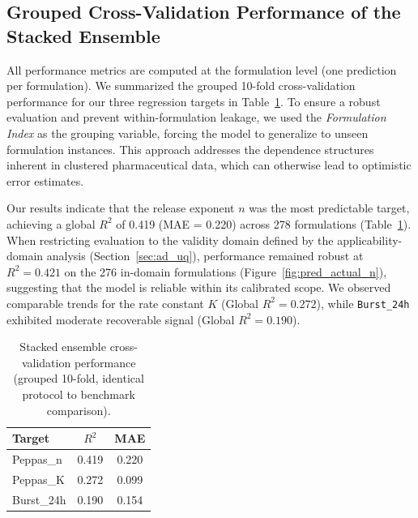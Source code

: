 \documentclass[preprint,12pt,authoryear]{elsarticle}
\begin{document}
\subsection{Grouped Cross-Validation Performance of the Stacked Ensemble}

All performance metrics are computed at the formulation level (one prediction per formulation). We summarized the grouped 10-fold cross-validation performance for our three regression targets in Table~\ref{tab:cv_performance}. To ensure a robust evaluation and prevent within-formulation leakage, we used the \textit{Formulation Index} as the grouping variable, forcing the model to generalize to unseen formulation instances. This approach addresses the dependence structures inherent in clustered pharmaceutical data, which can otherwise lead to optimistic error estimates.

Our results indicate that the release exponent $n$ was the most predictable target, achieving a global $R^2$ of 0.419 (MAE = 0.220) across 278 formulations (Table~\ref{tab:cv_performance}). When restricting evaluation to the validity domain defined by the applicability-domain analysis (Section~\ref{sec:ad_uq}), performance remained robust at $R^2 = 0.421$ on the 276 in-domain formulations (Figure~\ref{fig:pred_actual_n}), suggesting that the model is reliable within its calibrated scope. We observed comparable trends for the rate constant $K$ (Global $R^2 = 0.272$), while \texttt{Burst\_24h} exhibited moderate recoverable signal (Global $R^2 = 0.190$).


\begin{table}[H]
\centering
\caption{Stacked ensemble cross-validation performance (grouped 10-fold, identical protocol to benchmark comparison).}
\label{tab:cv_performance}
\begin{tabular}{lcc}
\toprule
Target & $R^2$ & MAE \\
\midrule
Peppas\_n & 0.419 & 0.220 \\
Peppas\_K & 0.272 & 0.099 \\
Burst\_24h & 0.190 & 0.154 \\
\bottomrule
\end{tabular}
\end{table}

\FloatBarrier

\end{document}
